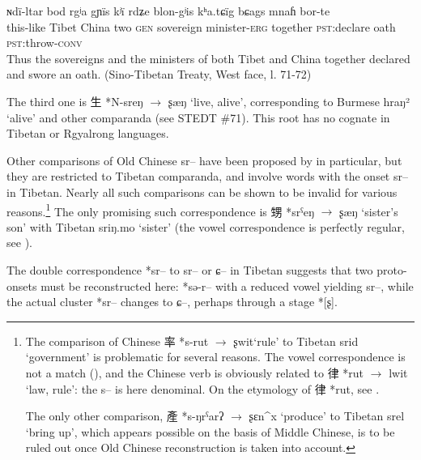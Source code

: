 \documentclass[oldfontcommands,oneside,a4paper,11pt]{article}
\newcommand{\ipa}[1]{{\phon #1}} %
\newcommand{\zh}[1]{{\cn #1}}
\begin{document}
\begin{exe}
\ex \label{ex:bshags}
\gll
\ipa{ɴdï-ltar} 	\ipa{bod} 	\ipa{rgʲa} 	\ipa{gɲïs} 	\ipa{kʲï} 	\ipa{rdʑe} \ipa{blon-gʲis} 	\ipa{kʰa.tɕïg} 	\ipa{bɕags} 	\ipa{mnaɦ} 	\ipa{bor-te} \\
this-like Tibet China two \textsc{gen} sovereign minister-\textsc{erg} together \textsc{pst}:declare oath \textsc{pst}:throw-\textsc{conv} \\
\glt Thus the sovereigns and the ministers of both Tibet and China together declared and swore an oath. (Sino-Tibetan Treaty, West face, l. 71-72)
\end{exe}

The third one is \zh{生} *\ipa{N-sreŋ} $\rightarrow$ \ipa{ʂæŋ} `live, alive', corresponding to Burmese \ipa{hraŋ²} `alive' and other comparanda (see STEDT \#71). This root has no cognate in Tibetan or Rgyalrong languages.

Other comparisons of Old Chinese \ipa{*sr--} have been proposed by \citet{coblin86handlist} in particular, but they are restricted to Tibetan comparanda, and involve words with the onset \ipa{sr--} in Tibetan. Nearly all such comparisons can be shown to be invalid for various reasons.\footnote{The comparison of Chinese \zh{率} *\ipa{s-rut} $\rightarrow$ \ipa{ʂwit}`rule' to Tibetan \ipa{srid} `government' is problematic for several reasons. The vowel correspondence is not a match (\citealt{gong95st}), and the Chinese verb is obviously related to \zh{律} *\ipa{rut} $\rightarrow$ \ipa{lwit} `law, rule': the \ipa{s--} is here denominal. On the etymology of \zh{律} *\ipa{rut}, see \citet{sagart14lv}.

The only other comparison, \zh{產} *\ipa{s-ŋrˁarʔ} $\rightarrow$ \ipa{ʂɛn^x} `produce' to Tibetan \ipa{srel} `bring up', which appears possible on the basis of Middle Chinese, is to be ruled out once Old Chinese reconstruction is taken into account.
}
The only promising such correspondence is \zh{甥} *\ipa{srˁeŋ} $\rightarrow$ \ipa{ʂæŋ} `sister's son' with Tibetan \ipa{sriŋ.mo} `sister' (the vowel correspondence is perfectly regular, see \citealt{hill14dempsey}).



The double correspondence *\ipa{sr--} to \ipa{sr--} or \ipa{ɕ--} in Tibetan suggests that two proto-onsets must be reconstructed here: *\ipa{sə-r--} with a reduced vowel yielding \ipa{sr--}, while the actual cluster *\ipa{sr--} changes to \ipa{ɕ--}, perhaps through a stage *[\ipa{ʂ}].
\end{document}
